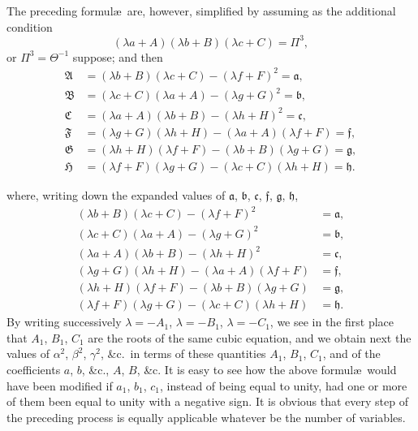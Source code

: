 \documentclass[11pt,a4paper]{book}
\begin{document}
The preceding formul\ae\ are, however, simplified by assuming as the additional condition
\[
(\lambda a + A)(\lambda b + B)(\lambda c + C) = \Pi^{3},
\]
or $\Pi^{3} = \Theta^{-1}$ suppose; and then
\begin{align*}
\mathfrak{A} &= (\lambda b + B)(\lambda c + C) - (\lambda f + F)^{2} = \mathfrak{a}, \\
\mathfrak{B} &= (\lambda c + C)(\lambda a + A) - (\lambda g + G)^{2} = \mathfrak{b}, \\
\mathfrak{C} &= (\lambda a + A)(\lambda b + B) - (\lambda h + H)^{2} = \mathfrak{c}, \\
\mathfrak{F} &= (\lambda g + G)(\lambda h + H) - (\lambda a + A)(\lambda f + F) = \mathfrak{f}, \\
\mathfrak{G} &= (\lambda h + H)(\lambda f + F) - (\lambda b + B)(\lambda g + G) = \mathfrak{g}, \\
\mathfrak{H} &= (\lambda f + F)(\lambda g + G) - (\lambda c + C)(\lambda h + H) = \mathfrak{h}.
\end{align*}

\newpage

\setcounter{page}{431}

where, writing down the expanded values of $\mathfrak{a}$, $\mathfrak{b}$, $\mathfrak{c}$, $\mathfrak{f}$, $\mathfrak{g}$, $\mathfrak{h}$,
\begin{align*}
(\lambda b + B)(\lambda c + C) - (\lambda f + F)^{2} &= \mathfrak{a}, \\
(\lambda c + C)(\lambda a + A) - (\lambda g + G)^{2} &= \mathfrak{b}, \\
(\lambda a + A)(\lambda b + B) - (\lambda h + H)^{2} &= \mathfrak{c}, \\
(\lambda g + G)(\lambda h + H) - (\lambda a + A)(\lambda f + F) &= \mathfrak{f}, \\
(\lambda h + H)(\lambda f + F) - (\lambda b + B)(\lambda g + G) &= \mathfrak{g}, \\
(\lambda f + F)(\lambda g + G) - (\lambda c + C)(\lambda h + H) &= \mathfrak{h}.
\end{align*}
By writing successively $\lambda = -A_{1}$, $\lambda = -B_{1}$, $\lambda = -C_{1}$, we see in the first place that $A_{1}$, $B_{1}$, $C_{1}$ are the roots of the same cubic equation, and we obtain next the values of $\alpha^{2}$, $\beta^{2}$, $\gamma^{2}$, \&c.\ in terms of these quantities $A_{1}$, $B_{1}$, $C_{1}$, and of the coefficients $a$, $b$, \&c., $A$, $B$, \&c. It is easy to see how the above formul\ae\ would have been modified if $a_{1}$, $b_{1}$, $c_{1}$, instead of being equal to unity, had one or more of them been equal to unity with a negative sign. It is obvious that every step of the preceding process is equally applicable whatever be the number of variables.
\end{document}
